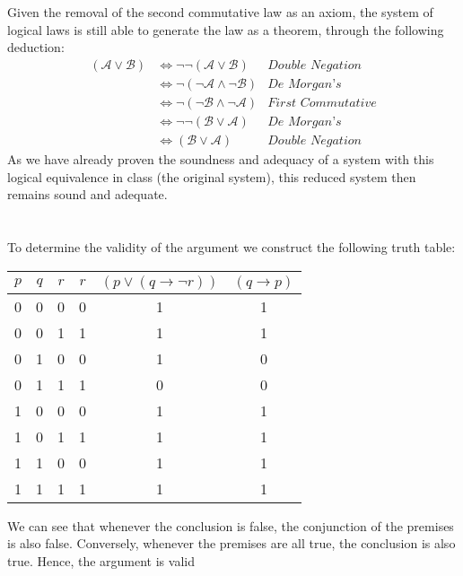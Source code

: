 \documentclass[11pt,oneside,a4paper]{article}
\begin{document}
\section{}
Given the removal of the second commutative law as an axiom, the system of logical laws is still able to generate the law as a theorem, through the following deduction:
\begin{align*}
(\mathcal{A} \vee \mathcal{B}) &\iff \neg \neg (\mathcal{A} \vee \mathcal{B}) &\textit{Double Negation}\\
&\iff \neg (\neg \mathcal{A} \wedge \neg \mathcal{B}) &\textit{De Morgan's}\\
&\iff \neg (\neg \mathcal{B} \wedge \neg \mathcal{A}) &\textit{First Commutative}\\
&\iff \neg \neg (\mathcal{B} \vee \mathcal{A}) &\textit{De Morgan's}\\
&\iff (\mathcal{B} \vee \mathcal{A}) &\textit{Double Negation}
\end{align*}
As we have already proven the soundness and adequacy of a system with this logical equivalence in class (the original system), this reduced system then remains sound and adequate.

\section{}
To determine the validity of the argument we construct the following truth table:
\begin{table}[h]
\begin{tabular}{|ccc|c|c|c|}
\hline
$p$ & $q$ & $r$ & $r$ & $(p \vee (q \to \neg r))$ & $(q \to p)$ \\ \hline
0 & 0 & 0 & 0 & 1 & 1 \\
0 & 0 & 1 & 1 & 1 & 1 \\
0 & 1 & 0 & 0 & 1 & 0 \\
0 & 1 & 1 & 1 & 0 & 0 \\
1 & 0 & 0 & 0 & 1 & 1 \\
1 & 0 & 1 & 1 & 1 & 1 \\
1 & 1 & 0 & 0 & 1 & 1 \\
1 & 1 & 1 & 1 & 1 & 1 \\ \hline
\end{tabular}
\end{table}

We can see that whenever the conclusion is false, the conjunction of the premises is also false. Conversely, whenever the premises are all true, the conclusion is also true. Hence, the argument is valid
\end{document}
